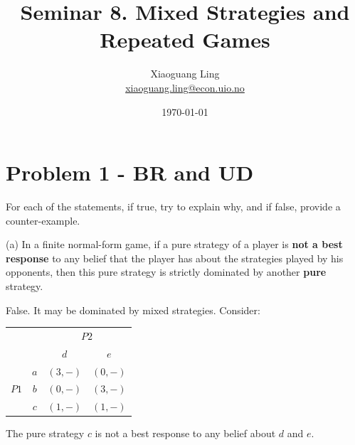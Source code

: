 \documentclass{article}
\title{Seminar 8. Mixed Strategies and Repeated Games}
\author{Xiaoguang Ling \\  \href{xiaoguang.ling@econ.uio.no}{xiaoguang.ling@econ.uio.no}}
\date{\today}
\begin{document}
\maketitle


\section{Problem 1 - BR and UD} 

For each of the statements, if true, try to explain why, and if false, provide a
counter-example.

\bigskip

(a) In a finite normal-form game, if a pure strategy of a
player is \textbf{not a best response} to any belief that the player has about the strategies played by his opponents, then this pure strategy is strictly dominated by another \textbf{pure} strategy.\\

\medskip

False. It may be dominated by mixed strategies.
Consider:

\begin{center}
\label{tab:brud}
\begin{tabular}{cc|c|c|}
  & \multicolumn{1}{c}{} & \multicolumn{2}{c}{$P2$}  \\
  & \multicolumn{1}{c}{} & \multicolumn{1}{c}{$d$} & \multicolumn{1}{c}{$e$} \\\cline{3-4}
            & $a$ & $(3,-)$ & $(0,-)$ \\   \cline{3-4}  
   $P1$ & $b$ & $(0,-)$ & $(3,-)$ \\   \cline{3-4}
            & $c$ & $(1,-)$ & $(1,-)$ \\   \cline{3-4}

\end{tabular}
\end{center}

The pure strategy $c$ is not a best response to any belief about $d$ and $e$.

\smallskip
\end{document}
